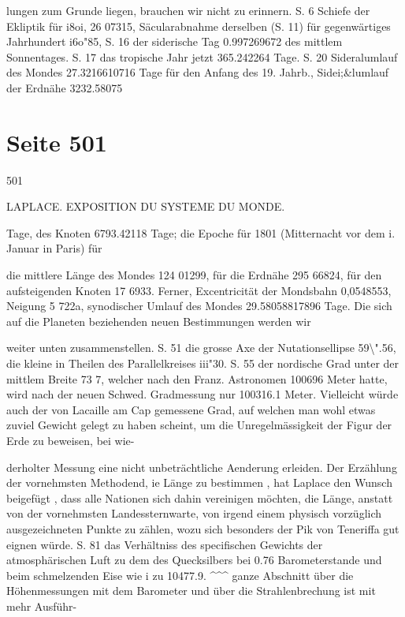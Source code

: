 \documentclass[10pt,a4paper]{article}
\begin{document}
lungen zum Grunde liegen, brauchen wir nicht zu erinnern. S. 6 Schiefe der Ekliptik für i8oi, 26\textdegree{} 07315, Säcularabnahme derselben (S. 11) für gegenwärtiges Jahrhundert i6o"85, S. 16 der siderische Tag 0.997269672 des mittlem Sonnentages. S. 17 das tropische Jahr jetzt 365.242264 Tage. S. 20 Sideralumlauf des Mondes 27.3216610716 Tage für den Anfang des 19. Jahrb., Sidei;\&lumlauf der Erdnähe 3232.58075


\newpage
\section*{Seite 501}
501

LAPLACE. EXPOSITION DU SYSTEME DU MONDE.

Tage, des Knoten 6793.42118 Tage; die Epoche für 1801 (Mitternacht vor dem i. Januar in Paris) für

die mittlere Länge des Mondes 124\textdegree{} 01299, für die Erdnähe 295\textdegree{} 66824, für den aufsteigenden Knoten 17\textdegree{} 6933. Ferner, Excentricität der Mondsbahn 0,0548553, Neigung 5\textdegree{} 722a, synodischer Umlauf des Mondes 29.58058817896 Tage. Die sich auf die Planeten beziehenden neuen Bestimmungen werden wir

weiter unten zusammenstellen. S. 51 die grosse Axe der Nutationsellipse 59\textbackslash{}".56, die kleine in Theilen des Parallelkreises iii"30. S. 55 der nordische Grad unter der mittlem Breite 73\textdegree{} 7, welcher nach den Franz. Astronomen 100696 Meter hatte, wird nach der neuen Schwed. Gradmessung nur 100316.1 Meter. Vielleicht würde auch der von Lacaille am Cap gemessene Grad, auf welchen man wohl etwas zuviel Gewicht gelegt zu haben scheint, um die Unregelmässigkeit der Figur der Erde zu beweisen, bei wie-

derholter Messung eine nicht unbeträchtliche Aenderung erleiden. Der Erzählung der vornehmsten Methodend, ie Länge zu bestimmen , hat Laplace den Wunsch beigefügt , dass alle Nationen sich dahin vereinigen möchten, die Länge, anstatt von der vornehmsten Landessternwarte, von irgend einem physisch vorzüglich ausgezeichneten Punkte zu zählen, wozu sich besonders der Pik von Teneriffa gut eignen würde. S. 81 das Verhältniss des specifischen Gewichts der atmosphärischen Luft zu dem des Quecksilbers bei 0.76 Barometerstande und beim schmelzenden Eise wie i zu 10477.9. \textasciicircum{}\textasciicircum{}\textasciicircum{} ganze Abschnitt über die Höhenmessungen mit dem Barometer und über die Strahlenbrechung ist mit mehr Ausführ-
\end{document}
